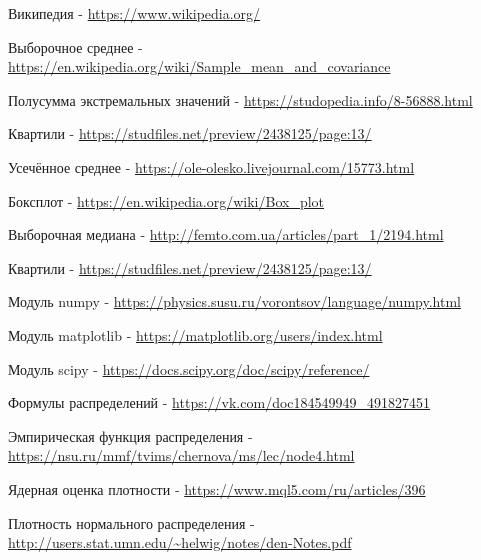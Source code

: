 \documentclass[12pt]{report}
\begin{document}
\begin{thebibliography}{}
	Википедия  -  
	\url{https://www.wikipedia.org/}
	
    Выборочное среднее  -  
    \url{https://en.wikipedia.org/wiki/Sample\_mean\_and\_covariance}
    
    Полусумма экстремальных значений  -  
    \url{https://studopedia.info/8-56888.html}
    
    Квартили  -  
    \url{https://studfiles.net/preview/2438125/page:13/}
    
    Усечённое среднее  -  
    \url{https://ole-olesko.livejournal.com/15773.html}
    
    Боксплот - 
    \url{https://en.wikipedia.org/wiki/Box\_plot}

    Выборочная медиана  -  
    \url{http://femto.com.ua/articles/part\_1/2194.html}
    
    Квартили -  
    \url{https://studfiles.net/preview/2438125/page:13/}
	
    Модуль numpy  -  
    \url{https://physics.susu.ru/vorontsov/language/numpy.html}
    
    Модуль matplotlib - 
    \url{https://matplotlib.org/users/index.html}
    
    Модуль scipy - 
    \url{https://docs.scipy.org/doc/scipy/reference/}
    
    Формулы распределений  -  
    \url{https://vk.com/doc184549949\_491827451}
    
    Эмпирическая функция распределения - 
    \url{https://nsu.ru/mmf/tvims/chernova/ms/lec/node4.html}
    
    Ядерная оценка плотности - 
    \url{https://www.mql5.com/ru/articles/396}
    
    Плотность нормального распределения - 
    \url{http://users.stat.umn.edu/~helwig/notes/den-Notes.pdf}
    
\end{thebibliography}
\end{document}
